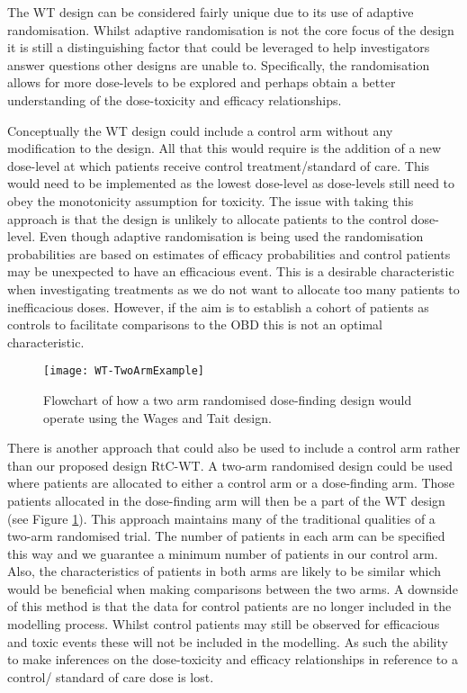 The WT design can be considered fairly unique due to its use of adaptive randomisation. Whilst adaptive randomisation is not the core focus of the design it is still a distinguishing factor that could be leveraged to help investigators answer questions other designs are unable to. Specifically, the randomisation allows for more dose-levels to be explored and perhaps obtain a better understanding of the dose-toxicity and efficacy relationships. 

Conceptually the WT design could include a control arm without any modification to the design. All that this would require is the addition of a new dose-level at which patients receive control treatment/standard of care. This would need to be implemented as the lowest dose-level as dose-levels still need to obey the monotonicity assumption for toxicity. The issue with taking this approach is that the design is unlikely to allocate patients to the control dose-level. Even though adaptive randomisation is being used the randomisation probabilities are based on estimates of efficacy probabilities and control patients may be unexpected to have an efficacious event. This is a desirable characteristic when investigating treatments as we do not want to allocate too many patients to inefficacious doses. However, if the aim is to establish a cohort of patients as controls to facilitate comparisons to the OBD this is not an optimal characteristic. 

\begin{figure}[!h]
	\centering
	\caption[Flowchart of a two arm randomised dose-finding trial.]{Flowchart of how a two arm randomised dose-finding design would operate using the Wages and Tait design.}
	\label{fig_wt:TwoArmExample}
	\texttt{[image: WT-TwoArmExample]}
\end{figure}

There is another approach that could also be used to include a control arm rather than our proposed design RtC-WT. A two-arm randomised design could be used where patients are allocated to either a control arm or a dose-finding arm. Those patients allocated in the dose-finding arm will then be a part of the WT design (see Figure \ref{fig_wt:TwoArmExample}). This approach maintains many of the traditional qualities of a two-arm randomised trial. The number of patients in each arm can be specified this way and we guarantee a minimum number of patients in our control arm. Also, the characteristics of patients in both arms are likely to be similar which would be beneficial when making comparisons between the two arms. A downside of this method is that the data for control patients are no longer included in the modelling process. Whilst control patients may still be observed for efficacious and toxic events these will not be included in the modelling. As such the ability to make inferences on the dose-toxicity and efficacy relationships in reference to a control/ standard of care dose is lost. 

